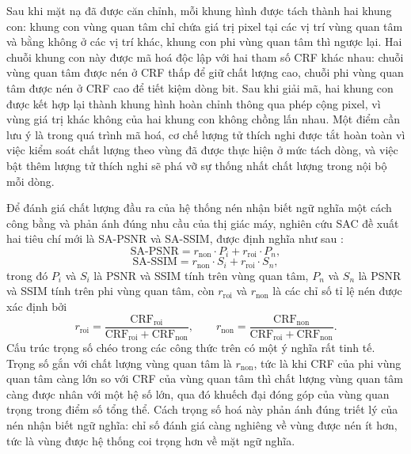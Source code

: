 Sau khi mặt nạ đã được căn chỉnh, mỗi khung hình được tách thành hai khung con: khung con vùng quan tâm chỉ chứa giá trị pixel tại các vị trí vùng quan tâm và bằng không ở các vị trí khác, khung con phi vùng quan tâm thì ngược lại. Hai chuỗi khung con này được mã hoá độc lập với hai tham số CRF khác nhau: chuỗi vùng quan tâm được nén ở CRF thấp để giữ chất lượng cao, chuỗi phi vùng quan tâm được nén ở CRF cao để tiết kiệm dòng bit. Sau khi giải mã, hai khung con được kết hợp lại thành khung hình hoàn chỉnh thông qua phép cộng pixel, vì vùng giá trị khác không của hai khung con không chồng lấn nhau. Một điểm cần lưu ý là trong quá trình mã hoá, cơ chế lượng tử thích nghi được tắt hoàn toàn vì việc kiểm soát chất lượng theo vùng đã được thực hiện ở mức tách dòng, và việc bật thêm lượng tử thích nghi sẽ phá vỡ sự thống nhất chất lượng trong nội bộ mỗi dòng.

Để đánh giá chất lượng đầu ra của hệ thống nén nhận biết ngữ nghĩa một cách công bằng và phản ánh đúng nhu cầu của thị giác máy, nghiên cứu SAC đề xuất hai tiêu chí mới là SA-PSNR và SA-SSIM, được định nghĩa như sau \cite{SAC}:
\begin{equation}
  \text{SA-PSNR} = r_{\text{non}} \cdot P_i + r_{\text{roi}} \cdot P_n,
\end{equation}
\begin{equation}
  \text{SA-SSIM} = r_{\text{non}} \cdot S_i + r_{\text{roi}} \cdot S_n,
\end{equation}
trong đó $P_i$ và $S_i$ là PSNR và SSIM tính trên vùng quan tâm, $P_n$ và $S_n$ là PSNR và SSIM tính trên phi vùng quan tâm, còn $r_{\text{roi}}$ và $r_{\text{non}}$ là các chỉ số tỉ lệ nén được xác định bởi
\begin{equation}
  r_{\text{roi}} = \frac{\text{CRF}_{\text{roi}}}{\text{CRF}_{\text{roi}} + \text{CRF}_{\text{non}}}, \qquad
  r_{\text{non}} = \frac{\text{CRF}_{\text{non}}}{\text{CRF}_{\text{roi}} + \text{CRF}_{\text{non}}}.
\end{equation}
Cấu trúc trọng số chéo trong các công thức trên có một ý nghĩa rất tinh tế. Trọng số gắn với chất lượng vùng quan tâm là $r_{\text{non}}$, tức là khi CRF của phi vùng quan tâm càng lớn so với CRF của vùng quan tâm thì chất lượng vùng quan tâm càng được nhân với một hệ số lớn, qua đó khuếch đại đóng góp của vùng quan trọng trong điểm số tổng thể. Cách trọng số hoá này phản ánh đúng triết lý của nén nhận biết ngữ nghĩa: chỉ số đánh giá càng nghiêng về vùng được nén ít hơn, tức là vùng được hệ thống coi trọng hơn về mặt ngữ nghĩa.

